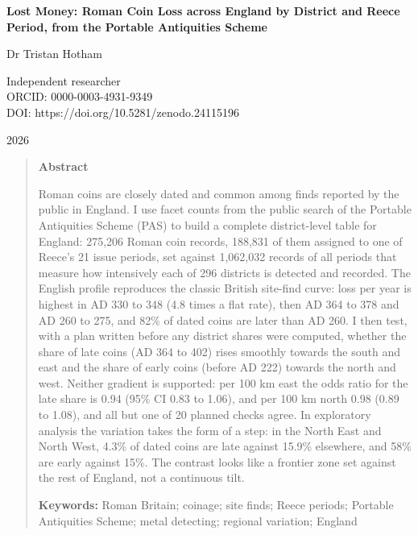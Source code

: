 \documentclass[11pt,a4paper]{article}
\begin{document}
\begin{center}
{\Large\bfseries Lost Money: Roman Coin Loss across England by District and Reece Period, from the Portable Antiquities Scheme\par}
\vspace{1.2em}
{\large Dr Tristan Hotham\par}
\vspace{0.3em}
{\small Independent researcher\\
ORCID: 0000-0003-4931-9349\\
DOI: https://doi.org/10.5281/zenodo.24115196\par}
\vspace{0.8em}
2026
\end{center}

\begin{quote}
\small
\begin{center}\textbf{Abstract}\end{center}
Roman coins are closely dated and common among finds reported by the public in England. I use facet counts from the public search of the Portable Antiquities Scheme (PAS) to build a complete district-level table for England: 275,206 Roman coin records, 188,831 of them assigned to one of Reece's 21 issue periods, set against 1,062,032 records of all periods that measure how intensively each of 296 districts is detected and recorded. The English profile reproduces the classic British site-find curve: loss per year is highest in AD 330 to 348 (4.8 times a flat rate), then AD 364 to 378 and AD 260 to 275, and 82\% of dated coins are later than AD 260. I then test, with a plan written before any district shares were computed, whether the share of late coins (AD 364 to 402) rises smoothly towards the south and east and the share of early coins (before AD 222) towards the north and west. Neither gradient is supported: per 100 km east the odds ratio for the late share is 0.94 (95\% CI 0.83 to 1.06), and per 100 km north 0.98 (0.89 to 1.08), and all but one of 20 planned checks agree. In exploratory analysis the variation takes the form of a step: in the North East and North West, 4.3\% of dated coins are late against 15.9\% elsewhere, and 58\% are early against 15\%. The contrast looks like a frontier zone set against the rest of England, not a continuous tilt.

\textbf{Keywords:} Roman Britain; coinage; site finds; Reece periods; Portable Antiquities Scheme; metal detecting; regional variation; England
\end{quote}
\end{document}
